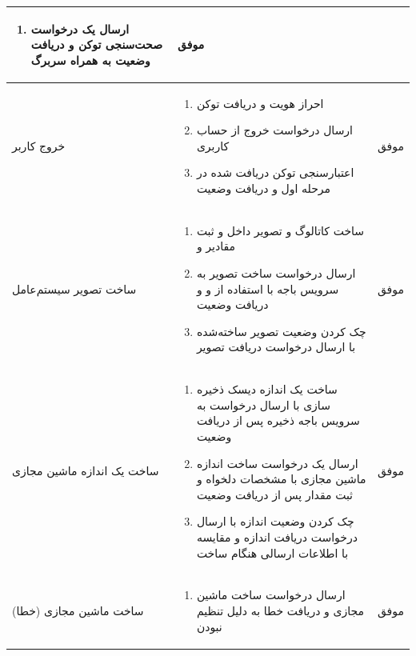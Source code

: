 \begin{center}
\begin{longtable}{ | P{2cm} | P{11cm} | c | }
{\begin{enumerate}[rightmargin=1cm,topsep=0pt,partopsep=0pt]
			\item ارسال یک درخواست صحت‌سنجی توکن و دریافت وضعیت  به همراه سربرگ 
		\end{enumerate}
	} &
		موفق \\ \hline

		
خروج کاربر &
{\footnotesize
	\begin{enumerate}[rightmargin=1cm,topsep=0pt,partopsep=0pt]
		\item احراز هویت و دریافت توکن
		
		\item ارسال درخواست خروج از حساب کاربری
		
		\item اعتبارسنجی توکن دریافت شده در مرحله اول و دریافت وضعیت 
	\end{enumerate}
} &
موفق \\ \hline
		
		
ساخت تصویر سیستم‌عامل&
{\footnotesize
	\begin{enumerate}[rightmargin=1cm,topsep=0pt,partopsep=0pt]
		\item ساخت کاتالوگ و تصویر داخل  و ثبت مقادیر  و 
		
		\item ارسال درخواست ساخت تصویر به سرویس باجه با استفاده از  و  و دریافت وضعیت 
		
		\item چک کردن وضعیت تصویر ساخته‌شده با ارسال درخواست دریافت تصویر
	\end{enumerate}
} &
موفق \\ \hline


ساخت یک اندازه ماشین مجازی&
{\footnotesize
	\begin{enumerate}[rightmargin=1cm,topsep=0pt,partopsep=0pt]
		\item ساخت یک اندازه دیسک ذخیره سازی با ارسال درخواست به سرویس باجه ذخیره  پس از دریافت وضعیت 
		
		\item ارسال یک درخواست ساخت اندازه ماشین مجازی با مشخصات دلخواه و ثبت مقدار  پس از دریافت وضعیت 
		
		\item چک کردن وضعیت اندازه با ارسال درخواست دریافت اندازه و مقایسه با اطلاعات ارسالی هنگام ساخت
	\end{enumerate}
} &
موفق \\ \hline


	ساخت ماشین مجازی (خطا)&
	{\footnotesize
		\begin{enumerate}[rightmargin=1cm,topsep=0pt,partopsep=0pt]
			\item ارسال درخواست ساخت ماشین مجازی و دریافت خطا به دلیل تنظیم نبودن 
		\end{enumerate}
	} &
	موفق \\ \hline
		



\end{longtable}
\end{center}
